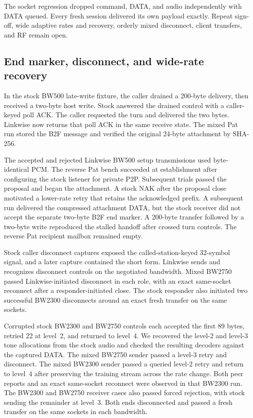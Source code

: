 \documentclass[11pt,a4paper]{article}
\begin{document}
The socket regression dropped command, DATA, and audio independently
with DATA queued. Every fresh session delivered its own payload
exactly. Repeat sign-off, wide adaptive rates and recovery,
orderly mixed disconnect, client transfers, and RF remain open.

\subsection{End marker, disconnect, and wide-rate recovery}

In the stock BW500 late-write fixture, the caller drained a 200-byte
delivery, then received a two-byte host write. Stock answered the
drained control with a caller-keyed poll ACK. The caller requested the
turn and delivered the two bytes. Linkwise now returns that poll ACK
in the same receive state. The mixed Pat run stored the B2F message
and verified the original 24-byte attachment by SHA-256.

The accepted and rejected Linkwise BW500 setup transmissions used
byte-identical PCM. The reverse Pat bench succeeded at establishment
after configuring the stock listener for private P2P. Subsequent
trials passed the proposal and began the attachment. A stock NAK
after the proposal close motivated a lower-rate retry that retains
the acknowledged prefix. A subsequent run delivered the compressed
attachment DATA, but the stock receiver did not accept the separate
two-byte B2F end marker. A 200-byte transfer followed by a two-byte
write reproduced the stalled handoff after crossed turn controls.
The reverse Pat recipient mailbox remained empty.

Stock caller disconnect captures exposed the called-station-keyed
32-symbol signal, and a later capture contained the short form.
Linkwise sends and recognizes disconnect controls on the negotiated
bandwidth. Mixed BW2750 passed Linkwise-initiated disconnect in each
role, with an exact same-socket reconnect after a responder-initiated
close. The stock responder also initiated two successful BW2300
disconnects around an exact fresh transfer on the same sockets.

Corrupted stock BW2300 and BW2750 controls each accepted the first
89 bytes, retried 22 at level~2, and returned to level~4. We
recovered the level-2 and level-3 tone allocations from the stock
audio and checked the resulting decoders against the captured
DATA. The mixed BW2750 sender passed a level-3 retry and disconnect.
The mixed BW2300 sender passed a queried level-2 retry and return
to level~4 after preserving the training stream across the rate
change. Both peer reports and an exact same-socket reconnect
were observed in that BW2300 run.
The BW2300 and BW2750 receiver cases also passed forced rejection,
with stock sending the remainder at level~3. Both ends disconnected
and passed a fresh transfer on the same sockets in each bandwidth.
\end{document}
